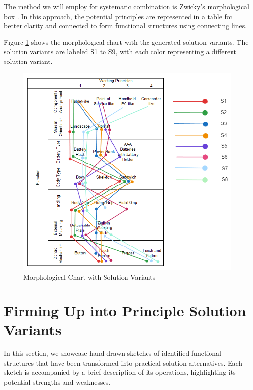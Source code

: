 The method we will employ for systematic combination is Zwicky's morphological box \cite{Kushahrin22}. In this approach, the potential principles are represented in a table for better clarity and connected to form functional structures using connecting lines.

Figure \ref{fig:morphological-chart-with-solution-variants} shows the morphological chart with the generated solution variants. The solution variants are labeled S1 to S9, with each color representing a different solution variant.

\begin{figure}[ht!]
    \centering
    \includegraphics[width=\linewidth]{texs/Part1/chapter3/image/combinedchart.png}
    \caption{Morphological Chart with Solution Variants}
    \label{fig:morphological-chart-with-solution-variants}
\end{figure}

\section{Firming Up into Principle Solution Variants}
In this section, we showcase hand-drawn sketches of identified functional structures that have been transformed into practical solution alternatives. Each sketch is accompanied by a brief description of its operations, highlighting its potential strengths and weaknesses.

